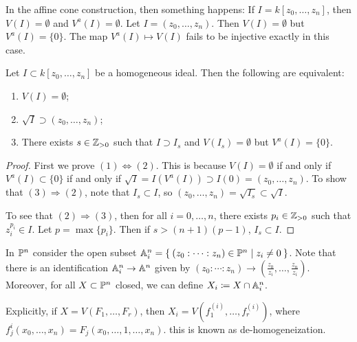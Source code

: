 \documentclass[twoside, 10pt]{article}
\begin{document}
    \begin{rmk} In the affine cone construction, then something happens: If $I
        = k[z_0, \ldots, z_n]$, then $V(I) = \emptyset$ and $V^a(I) =
        \emptyset$. Let $I = (z_0, \ldots, z_n)$. Then $V(I) =\emptyset $ but
        $V^a(I) = \{0\}$.  The map $V^a(I) \mapsto V(I)$ fails to be injective
        exactly in this case.  \end{rmk}

    \begin{prop} Let $I \subset k[z_0, \ldots, z_n]$ be a homogeneous ideal.
        Then the following are equivalent: \begin{enumerate} \item $V(I) =
            \emptyset$; \item $\sqrt{I} \supset (z_0, \ldots, z_n)$; \item
            There exists $s \in \Z_{>0}$ such that $I \supset I_s$ and $V(I_s)
        = \emptyset$ but $V^a(I) = \{0\}$.  \end{enumerate} \begin{proof} First
        we prove $(1) \Leftrightarrow (2)$. This is because $V(I) = \emptyset$
        if and only if $V^a(I) \subset \{0\}$ if and only if $\sqrt{I} =
        I(V^a(I)) \supset I(0) = (z_0, \ldots, z_n)$. To show that $(3)
        \Rightarrow (2)$, note that $I_s \subset I$, so $(z_0, \ldots,
        z_n)=\sqrt{I_s} \subset \sqrt{I}$.

            To see that $(2) \Rightarrow (3)$, then for all $i = 0, \ldots, n$,
        there exists $p_i \in \Z_{> 0}$ such that $z_i^{p_i} \in I$. Let $p =
    \max\{p_i\}$. Then if $s > (n+1)(p-1)$, $I_s \subset I$.  \end{proof}
\end{prop}

    \begin{defn} In $\P^n$ consider the open subset $\A_i^n =
        \Set{(z_0:\cdots:z_n) \in \P^n | z_i \neq 0}$. Note that there is an
        identification $\A_i^n \to \A^n$ given by $(z_0:\cdots:z_n) \to \left(
        \frac{z_0}{z_i}, \ldots, \frac{z_n}{z_i} \right)$. Moreover, for all $X
        \subset \P^n$ closed, we can define $X_i \coloneqq X \cap \A_i^n$.
    \end{defn}

    Explicitly, if $X = V(F_1, \ldots, F_r)$, then $X_i = V(f_1^{(i)}, \ldots,
    f_r^{(i)})$, where $f_j^{i}(x_0, \ldots, x_n) = F_j(x_0, \ldots, 1, \ldots,
    x_n)$. this is known as de-homogeneization.
\end{document}
